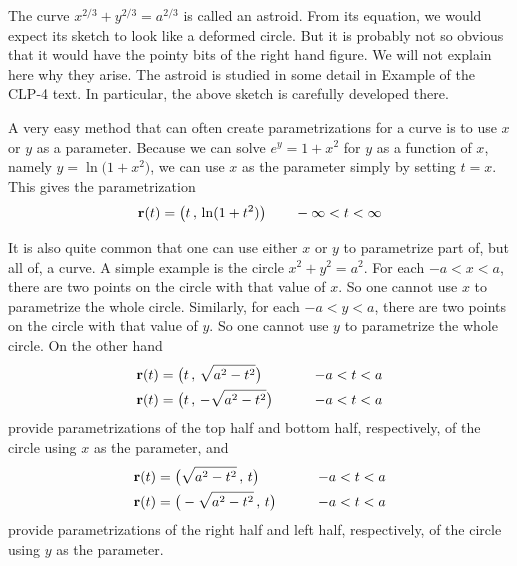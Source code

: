 \begin{eg}[Parametrization of  $\frac{x^2}{a^2}+\frac{y^2}{b^2}=1$ and of
$x^{2/3}+y^{2/3}=a^{2/3}$]
\begin{wfig}
\begin{center}
\end{center}
\end{wfig}
The curve $x^{2/3}+y^{2/3}=a^{2/3}$ is called an astroid. From its equation,
we would expect its sketch to look like a deformed circle. But it is probably 
not so obvious that it would have the pointy bits of the right hand figure.
We will not explain here why they arise. The astroid is studied in some 
detail in Example  of the CLP-4 text.
In particular, the above sketch is carefully developed there.  
 
\end{eg}

\begin{eg}[Parametrization of  $e^y=1+x^2$]\label{eg:paramMessy}
A very easy method that can often create parametrizations for a curve is to use $x$ or $y$ as a parameter. Because we can solve $e^y=1+x^2$ for $y$ as a function of $x$, namely $y=\ln\big(1+x^2\big)$, we can use $x$ as 
the parameter simply by setting $t=x$. This gives the parametrization
\begin{equation*}
\mathbf{r}(t) = \big(t\,,\,\ln(1+t^2)\big)\qquad -\infty<t<\infty
\end{equation*}  
\end{eg}

\begin{eg}[Parametrization of  $x^2+y^2=a^2$, again]\label{eg:paramCircleC}
It is also quite common that one can use either $x$ or $y$ to parametrize part of, but all of, a curve. A simple example is the circle $x^2+y^2=a^2$.
For each $-a<x<a$, there are two points on the circle with that value of $x$.
So one cannot use $x$ to parametrize the whole circle.
Similarly, for each $-a<y<a$, there are two points on the circle with that value of $y$. So one cannot use $y$ to parametrize the whole circle. On the other 
hand
\begin{alignat*}{3}
\mathbf{r}(t) &= \big(t\,,\,\sqrt{a^2-t^2}\big)\qquad &-a<t<a \\
\mathbf{r}(t) &= \big(t\,,\,-\sqrt{a^2-t^2}\big)\qquad &-a<t<a
\end{alignat*}
provide parametrizations of the top half and bottom half, respectively,
of the circle using $x$ as the parameter, and
\begin{alignat*}{3}
\mathbf{r}(t) &= \big(\sqrt{a^2-t^2}\,,\,t\big)\qquad &-a<t<a \\
\mathbf{r}(t) &= \big(-\sqrt{a^2-t^2}\,,\,t\big)\qquad &-a<t<a
\end{alignat*}
provide parametrizations of the right half and left half, respectively,
of the circle using $y$ as the parameter.
\end{eg}

